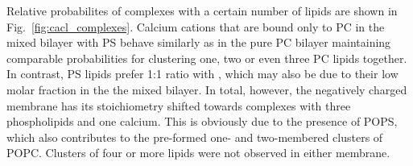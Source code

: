 Relative probabilites of  complexes with a certain number of lipids are shown in Fig.~\ref{fig:cacl_complexes}. 
Calcium cations that are bound only to PC in the mixed bilayer with PS 
behave similarly as in the pure PC bilayer
maintaining comparable probabilities for clustering one, two or even three PC lipids together. 
In contrast, PS lipids prefer 1:1 ratio with ,
which may also be due to their low molar fraction in the the mixed bilayer. 
In total, however, the negatively charged membrane has its stoichiometry 
shifted towards complexes with three phospholipids and one calcium. 
This is obviously due to the presence of POPS, 
which also contributes to the pre-formed one- and two-membered clusters of POPC. 
Clusters of four or more lipids were not observed in either membrane. 










 
 
 









